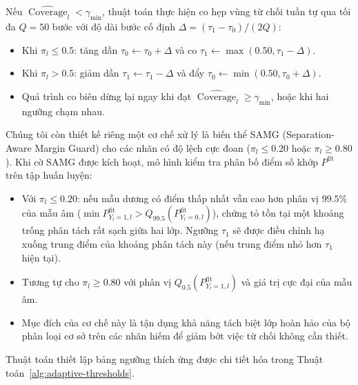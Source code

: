 \documentclass[11pt,a4paper]{article}
\newcounter{alg}
\begin{document}
Nếu \(\widehat{\operatorname{Coverage}}_l < \gamma_{\min}\), thuật toán thực hiện co hẹp vùng từ chối tuần tự qua tối đa \(Q=50\) bước với độ dài bước cố định \(\Delta = (\tau_1 - \tau_0)/(2Q)\):
\begin{itemize}
  \item Khi \(\pi_l \le 0.5\): tăng dần \(\tau_0 \gets \tau_0 + \Delta\) và co \(\tau_1 \gets \max(0.50, \tau_1 - \Delta)\).
  \item Khi \(\pi_l > 0.5\): giảm dần \(\tau_1 \gets \tau_1 - \Delta\) và đẩy \(\tau_0 \gets \min(0.50, \tau_0 + \Delta)\).
  \item Quá trình co biên dừng lại ngay khi đạt \(\widehat{\operatorname{Coverage}}_l \ge \gamma_{\min}\), hoặc khi hai ngưỡng chạm nhau.
\end{itemize}

Chúng tôi còn thiết kế riêng một cơ chế xử lý là biến thể SAMG (Separation-Aware Margin Guard) cho các nhãn có độ lệch cực đoan (\(\pi_l \le 0.20\) hoặc \(\pi_l \ge 0.80\)). Khi cờ SAMG được kích hoạt, mô hình kiểm tra phân bố điểm số khớp \(P^{\mathrm{fit}}\) trên tập huấn luyện:
\begin{itemize}
  \item Với \(\pi_l \le 0.20\): nếu mẫu dương có điểm thấp nhất vẫn cao hơn phân vị \(99.5\%\) của mẫu âm (\(\min P^{\mathrm{fit}}_{Y_l=1,l} > Q_{99.5}(P^{\mathrm{fit}}_{Y_l=0,l})\)), chứng tỏ tồn tại một khoảng trống phân tách rất sạch giữa hai lớp. Ngưỡng \(\tau_1\) sẽ được điều chỉnh hạ xuống trung điểm của khoảng phân tách này (nếu trung điểm nhỏ hơn \(\tau_1\) hiện tại).
  \item Tương tự cho \(\pi_l \ge 0.80\) với phân vị \(Q_{0.5}(P^{\mathrm{fit}}_{Y_l=1,l})\) và giá trị cực đại của mẫu âm.
  \item Mục đích của cơ chế này là tận dụng khả năng tách biệt lớp hoàn hảo của bộ phân loại cơ sở trên các nhãn hiếm để giảm bớt việc từ chối không cần thiết.
\end{itemize}

Thuật toán thiết lập bảng ngưỡng thích ứng được chi tiết hóa trong Thuật toán~\ref{alg:adaptive-thresholds}.
\end{document}
